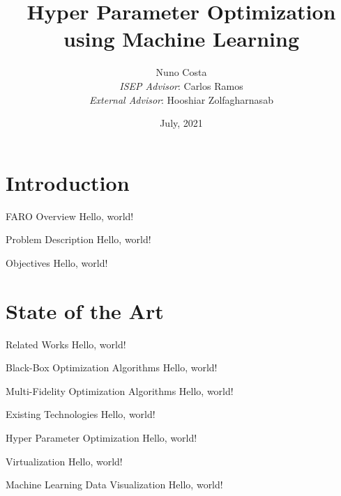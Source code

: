 \documentclass{beamer}
\title{Hyper Parameter Optimization \\using Machine Learning}
\date{July, 2021}
\author{{Nuno Costa} \\
{\textit{ISEP Advisor}: Carlos Ramos} \\
{\textit{External Advisor}: Hooshiar Zolfagharnasab}}
\institute{Polytechnic of Porto - School of Engineering (ISEP)}
\begin{document}
  \maketitle
  \section{Introduction}
  \begin{frame}{FARO Overview}
    Hello, world!
  \end{frame}
  \begin{frame}{Problem Description}
    Hello, world!
  \end{frame}
  \begin{frame}{Objectives}
    Hello, world!
  \end{frame}
  \section{State of the Art}
  \begin{frame}{Related Works}
    Hello, world!
  \end{frame}
  \begin{frame}{Black-Box Optimization Algorithms}
    Hello, world!
  \end{frame}
  \begin{frame}{Multi-Fidelity Optimization Algorithms}
    Hello, world!
  \end{frame}
  \begin{frame}{Existing Technologies}
    Hello, world!
  \end{frame}
  \begin{frame}{Hyper Parameter Optimization}
    Hello, world!
  \end{frame}
  \begin{frame}{Virtualization}
    Hello, world!
  \end{frame}
  \begin{frame}{Machine Learning Data Visualization}
    Hello, world!
  \end{frame}
\end{document}
